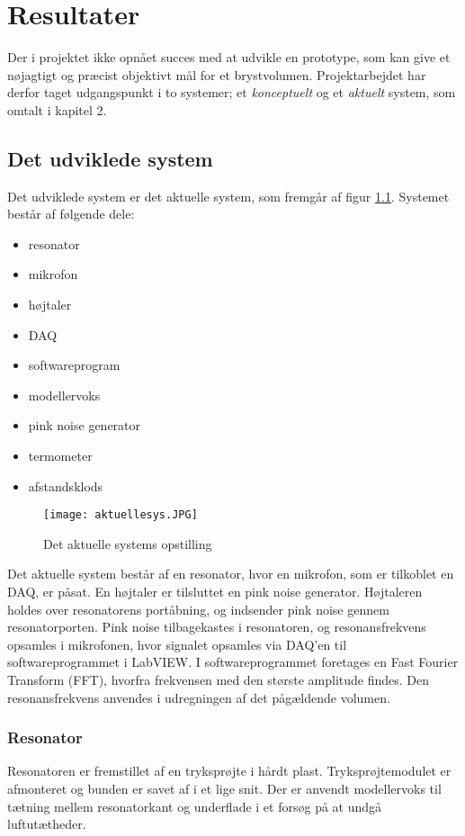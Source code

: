 \chapter{Resultater}
Der i projektet ikke opnået succes med at udvikle en prototype, som kan give et nøjagtigt og præcist objektivt mål for et brystvolumen. Projektarbejdet har derfor taget udgangspunkt i to systemer; et \textit{konceptuelt} og et \textit{aktuelt} system, som omtalt i kapitel 2.  

\section{Det udviklede system}
Det udviklede system er det aktuelle system, som fremgår af figur \ref{fig:aktuellesys}. Systemet består af følgende dele: 

\begin{itemize}
\item resonator	
\item mikrofon 
\item højtaler
\item DAQ
\item softwareprogram
\item modellervoks
\item pink noise generator
\item termometer
\item afstandsklods
\end{itemize}

\begin{figure}[!h]
\centering
\texttt{[image: aktuellesys.JPG]}
\caption{Det aktuelle systems opstilling}
\label{fig:aktuellesys}	
\end{figure}

 Det aktuelle system består af en resonator, hvor en mikrofon, som er tilkoblet en DAQ, er påsat. En højtaler er tilsluttet en pink noise generator. Højtaleren holdes over resonatorens portåbning, og indsender pink noise gennem resonatorporten. Pink noise tilbagekastes i resonatoren, og resonansfrekvens opsamles i mikrofonen, hvor signalet opsamles via DAQ'en til softwareprogrammet i LabVIEW. I softwareprogrammet foretages en Fast Fourier Transform (FFT), hvorfra frekvensen med den største amplitude findes. Den resonansfrekvens anvendes i udregningen af det pågældende volumen.   

\subsection{Resonator}
Resonatoren er fremstillet af en tryksprøjte i hårdt plast. Tryksprøjtemodulet er afmonteret og bunden er savet af i et lige snit. Der er anvendt modellervoks til tætning mellem resonatorkant og underflade i et forsøg på at undgå luftutætheder. 

